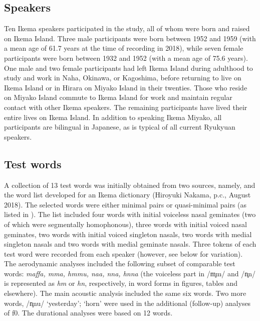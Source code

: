 \documentclass[output=paper]{langscibook}
\begin{document}
\subsection{Speakers}
\label{sec:shinohara:3.1}
Ten Ikema speakers participated in the study, all of whom were born and raised on Ikema Island. Three male participants were born between 1952 and 1959 (with a mean age of 61.7 years at the time of recording in 2018), while seven female participants were born between 1932 and 1952 (with a mean age of 75.6 years). One male and two female participants had left Ikema Island during adulthood to study and work in Naha, Okinawa, or Kagoshima, before returning to live on Ikema Island or in Hirara on Miyako Island in their twenties. Those who reside on Miyako Island commute to Ikema Island for work and maintain regular contact with other Ikema speakers. The remaining participants have lived their entire lives on Ikema Island. In addition to speaking Ikema Miyako, all participants are bilingual in Japanese, as is typical of all current Ryukyuan speakers.

\subsection{Test words}
\label{sec:shinohara:3.2}
A collection of 13 test words was initially obtained from two sources, namely, \citet{Kibe2012} and the word list developed for an Ikema dictionary (Hiroyuki Nakama, p.c., August 2018). The selected words were either minimal pairs or quasi-minimal pairs (as listed in ). The list included four words with initial voiceless nasal geminates (two of which were segmentally homophonous), three words with initial voiced nasal geminates, two words with initial voiced singleton nasals, two words with medial singleton nasals and two words with medial geminate nasals. Three tokens of each test word were recorded from each speaker (however, see below for variation). The aerodynamic analyses included the following subset of comparable test words: \textit{maffa, mma, hmmu, naa, nna, hnna} (the voiceless part in /m̥m/ and /n̥n/ is represented as \textit{hm} or \textit{hn}, respectively, in word forms in figures, tables and elsewhere). The main acoustic analysis included the same six words. Two more words, /n̥nu/ ‘yesterday’; ‘horn’ were used in the additional (follow-up) analyses of f0. The durational analyses were based on 12 words.
\end{document}
